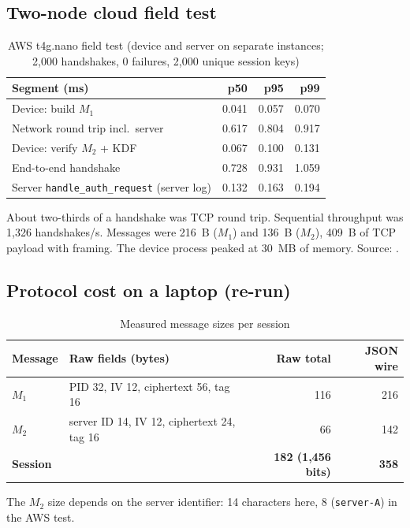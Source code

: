 \documentclass[12pt,a4paper,oneside]{report}
\numberwithin{equation}{chapter}
\begin{document}
\subsection*{Two-node cloud field test}
\begin{table}[H]
\centering
\caption{AWS t4g.nano field test (device and server on separate instances; 2{,}000 handshakes, 0 failures, 2{,}000 unique session keys)}
\label{tab:aws}
\small
\begin{tabular}{|l|r|r|r|}
\hline
\textbf{Segment (ms)} & \textbf{p50} & \textbf{p95} & \textbf{p99}\\ \hline
Device: build $M_1$ & 0.041 & 0.057 & 0.070\\ \hline
Network round trip incl.\ server & 0.617 & 0.804 & 0.917\\ \hline
Device: verify $M_2$ + KDF & 0.067 & 0.100 & 0.131\\ \hline
End-to-end handshake & 0.728 & 0.931 & 1.059\\ \hline
Server \texttt{handle\_auth\_request} (server log) & 0.132 & 0.163 & 0.194\\ \hline
\end{tabular}
\end{table}
\noindent About two-thirds of a handshake was TCP round trip. Sequential throughput was 1{,}326 handshakes/s. Messages were 216~B ($M_1$) and 136~B ($M_2$), 409~B of TCP payload with framing. The device process peaked at 30~MB of memory. Source: .

\subsection*{Protocol cost on a laptop (re-run)}
\begin{table}[H]
\centering
\caption{Measured message sizes per session}
\label{tab:comm}
\small
\begin{tabular}{|l|P{0.42\textwidth}|r|r|}
\hline
\textbf{Message} & \textbf{Raw fields (bytes)} & \textbf{Raw total} & \textbf{JSON wire}\\ \hline
$M_1$ & PID 32, IV 12, ciphertext 56, tag 16 & 116 & 216\\ \hline
$M_2$ & server ID 14, IV 12, ciphertext 24, tag 16 & 66 & 142\\ \hline
\textbf{Session} & & \textbf{182 (1{,}456 bits)} & \textbf{358}\\ \hline
\end{tabular}
\end{table}
\noindent The $M_2$ size depends on the server identifier: 14 characters here, 8 (\texttt{server-A}) in the AWS test.
\end{document}
